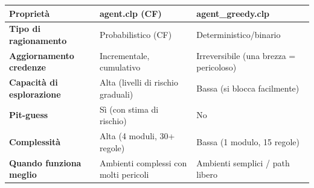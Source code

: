 \documentclass[12pt,a4paper]{article}
\begin{document}
\begin{center}
\renewcommand{\arraystretch}{1.4}
\begin{tabular}{p{3.5cm}p{5cm}p{5cm}}
\toprule
\textbf{Proprietà} & \textbf{agent.clp (CF)} & \textbf{agent\_greedy.clp} \\
\midrule
\textbf{Tipo di ragionamento} & Probabilistico (CF) & Deterministico/binario \\
\textbf{Aggiornamento credenze} & Incrementale, cumulativo & Irreversibile (una brezza = pericoloso) \\
\textbf{Capacità di esplorazione} & Alta (livelli di rischio graduali) & Bassa (si blocca facilmente) \\
\textbf{Pit-guess} & Sì (con stima di rischio) & No \\
\textbf{Complessità} & Alta (4 moduli, 30+ regole) & Bassa (1 modulo, 15 regole) \\
\textbf{Quando funziona meglio} & Ambienti complessi con molti pericoli & Ambienti semplici / path libero \\
\bottomrule
\end{tabular}
\end{center}
\end{document}
